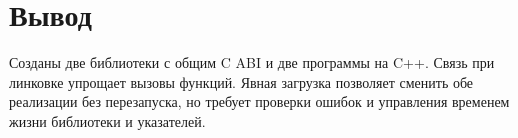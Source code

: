 \documentclass[12pt,a4paper,oneside]{article}
\begin{document}
\section{Вывод}
Созданы две библиотеки с общим C ABI и две программы на C++.
Связь при линковке упрощает вызовы функций. Явная загрузка позволяет
сменить обе реализации без перезапуска, но требует проверки ошибок
и управления временем жизни библиотеки и указателей.
\end{document}
